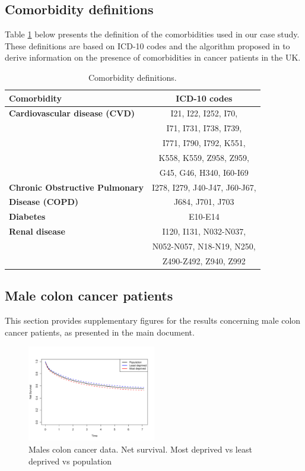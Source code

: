 \documentclass[12pt]{article}
\begin{document}
\subsection{Comorbidity definitions}
Table \ref{tab:comorbidities} below presents the definition of the comorbidities used in our case study. These definitions are based on ICD-10 codes and the algorithm proposed in \cite{maringe:2017} to derive information on the presence of comorbidities in cancer patients in the UK.
\begin{table}[ht!]
\centering
\begin{tabular}{lc}
\textbf{Comorbidity} & \textbf{ICD-10 codes}  \\ \hline \hline
\textbf{Cardiovascular disease (CVD)} & I21, I22, I252, I70, \\ 
 & I71, I731, I738, I739, \\
 & I771, I790, I792, K551, \\
 & K558, K559, Z958, Z959, \\
 & G45, G46, H340, I60-I69  \\ \hline
\textbf{Chronic Obstructive Pulmonary} & I278, I279, J40-J47, J60-J67, \\
\textbf{Disease (COPD)} & J684, J701, J703 \\ \hline
\textbf{Diabetes} & E10-E14   \\ \hline
\textbf{Renal disease} & I120, I131, N032-N037, \\ 
& N052-N057, N18-N19, N250, \\
& Z490-Z492, Z940, Z992   \\ 
\hline \hline
\end{tabular}
\caption{Comorbidity definitions.}
\label{tab:comorbidities}
\end{table}



\subsection{Male colon cancer patients}
This section provides supplementary figures for the results concerning male colon cancer patients, as presented in the main document. 

\begin{figure}[h!]
\centering
\includegraphics[width=0.5\textwidth]{nsdep15_males.pdf} 
\caption{ Males colon cancer data. Net survival. Most deprived vs least deprived vs population}
\label{fig:nsdep_males}
\end{figure}
\end{document}
